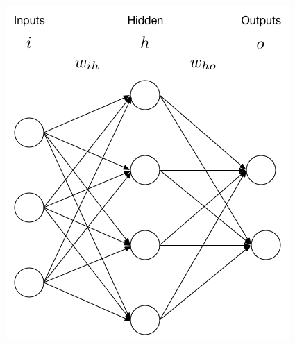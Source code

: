\documentclass{beamer}
\begin{document}
\begin{frame}[fragile]
\begin{columns}
\begin{column}{0.5\textwidth}
\includegraphics[width=\linewidth]{ann.png}
\end{column}
\end{columns}
\end{frame}
\end{document}
